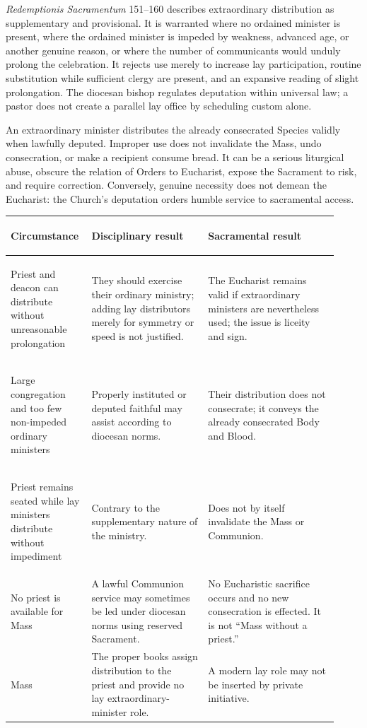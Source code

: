 \emph{Redemptionis Sacramentum} 151--160 describes extraordinary distribution as supplementary and provisional. It is warranted where no ordained minister is present, where the ordained minister is impeded by weakness, advanced age, or another genuine reason, or where the number of communicants would unduly prolong the celebration. It rejects use merely to increase lay participation, routine substitution while sufficient clergy are present, and an expansive reading of slight prolongation. The diocesan bishop regulates deputation within universal law; a pastor does not create a parallel lay office by scheduling custom alone.

An extraordinary minister distributes the already consecrated Species validly when lawfully deputed. Improper use does not invalidate the Mass, undo consecration, or make a recipient consume bread. It can be a serious liturgical abuse, obscure the relation of Orders to Eucharist, expose the Sacrament to risk, and require correction. Conversely, genuine necessity does not demean the Eucharist: the Church's deputation orders humble service to sacramental access.

\begin{longtable}{>{\bfseries\raggedright\arraybackslash}p{0.2\linewidth}>{\raggedright\arraybackslash}p{0.34\linewidth}>{\raggedright\arraybackslash}p{0.38\linewidth}}
\toprule
\textbf{Circumstance} & \textbf{Disciplinary result} & \textbf{Sacramental result}\\
\midrule
\endhead
Priest and deacon can distribute without unreasonable prolongation & They should exercise their ordinary ministry; adding lay distributors merely for symmetry or speed is not justified. & The Eucharist remains valid if extraordinary ministers are nevertheless used; the issue is liceity and sign.\\
Large congregation and too few non-impeded ordinary ministers & Properly instituted or deputed faithful may assist according to diocesan norms. & Their distribution does not consecrate; it conveys the already consecrated Body and Blood.\\
Priest remains seated while lay ministers distribute without impediment & Contrary to the supplementary nature of the ministry. & Does not by itself invalidate the Mass or Communion.\\
No priest is available for Mass & A lawful Communion service may sometimes be led under diocesan norms using reserved Sacrament. & No Eucharistic sacrifice occurs and no new consecration is effected. It is not “Mass without a priest.”\\
1962 Mass & The proper books assign distribution to the priest and provide no lay extraordinary-minister role. & A modern lay role may not be inserted by private initiative.\\
\bottomrule
\end{longtable}

